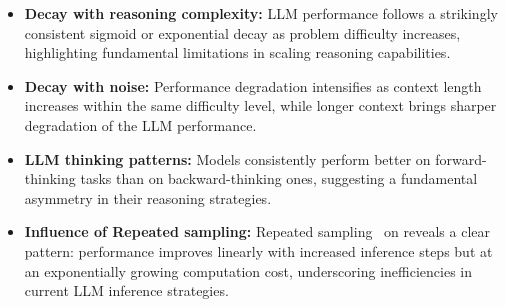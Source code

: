 \begin{itemize}[itemsep=0.0pt, topsep=0pt, leftmargin=*]
    \item \textbf{Decay with reasoning complexity:} LLM performance follows a strikingly consistent sigmoid or exponential decay as problem difficulty increases, highlighting fundamental limitations in scaling reasoning capabilities.  
     \item \textbf{Decay with noise:} Performance degradation intensifies as context length increases within the same difficulty level, while longer context brings sharper degradation of the LLM performance. 
    \item \textbf{LLM thinking patterns:} Models consistently perform better on forward-thinking tasks than on backward-thinking ones, suggesting a fundamental asymmetry in their reasoning strategies.  
    \item \textbf{Influence of Repeated sampling:} Repeated sampling~\citep{brown2024large} on \sysb reveals a clear pattern: performance improves linearly with increased inference steps but at an exponentially growing computation cost, underscoring inefficiencies in current LLM inference strategies.  
\end{itemize} 
